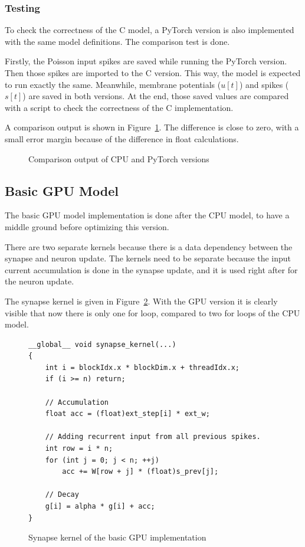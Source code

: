 \documentclass[conference]{IEEEtran}
\begin{document}
\subsubsection{Testing}

To check the correctness of the C model, a PyTorch version is also implemented with the same model definitions. The comparison test is done.

Firstly, the Poisson input spikes are saved while running the PyTorch version. Then those spikes are imported to the C version. This way, the model is expected to run exactly the same. Meanwhile, membrane potentials ($u[t]$) and spikes ($s[t]$) are saved in both versions. At the end, those saved values are compared with a script to check the correctness of the C implementation.

A comparison output is shown in Figure~\ref{fig:comp_w_pytorch}. The difference is close to zero, with a small error margin because of the difference in float calculations.

\begin{figure}[H]
  \centering
  \caption{Comparison output of CPU and PyTorch versions}
  \label{fig:comp_w_pytorch}
\end{figure}

\subsection{Basic GPU Model}

The basic GPU model implementation is done after the CPU model, to have a middle ground before optimizing this version.

There are two separate kernels because there is a data dependency between the synapse and neuron update. The kernels need to be separate because the input current accumulation is done in the synapse update, and it is used right after for the neuron update.

The synapse kernel is given in Figure~\ref{fig:Synapse_Basic_GPU_impl}. With the GPU version it is clearly visible that now there is only one for loop, compared to two for loops of the CPU model.

\begin{figure}[h]
\centering
\begin{lstlisting}
__global__ void synapse_kernel(...)
{
    int i = blockIdx.x * blockDim.x + threadIdx.x;
    if (i >= n) return;

    // Accumulation
    float acc = (float)ext_step[i] * ext_w;

    // Adding recurrent input from all previous spikes.
    int row = i * n;
    for (int j = 0; j < n; ++j)
        acc += W[row + j] * (float)s_prev[j];

    // Decay
    g[i] = alpha * g[i] + acc;
}
\end{lstlisting}
\caption{Synapse kernel of the basic GPU implementation}
\label{fig:Synapse_Basic_GPU_impl}
\end{figure}
\end{document}
